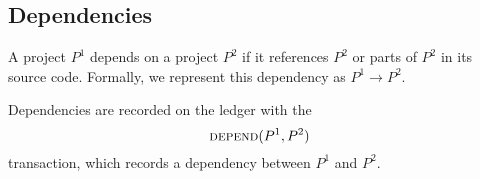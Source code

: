 \subsection{Dependencies}
\label{s:dependencies}

A project $P^1$ depends on a project $P^2$ if it references $P^2$
or parts of $P^2$ in its source code. Formally, we represent this dependency as
$P^1 \to P^2$.

Dependencies are recorded on the ledger with the
\[
    \text{\normalfont\scshape depend}\small{\lparen P^1, P^2\rparen}
\]
transaction, which records a dependency between $P^1$ and $P^2$.
